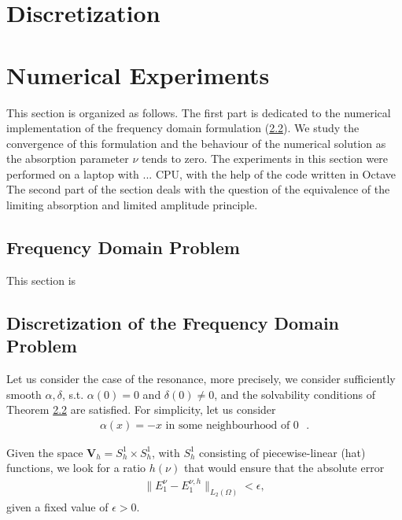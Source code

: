 \documentclass{article}
\begin{document}
\section{Discretization}

\section{Numerical Experiments}
This section is organized as follows. The first part is dedicated to the numerical implementation
of the frequency domain formulation (\ref{}). We study the convergence of this formulation and the behaviour 
of the numerical solution as the absorption parameter $\nu$ tends to zero. The experiments in this section were 
performed on a laptop with ... CPU, with the help of the code written in Octave 
The second part of the section deals with the question of the equivalence of the limiting absorption and limited amplitude 
principle.
\subsection{Frequency Domain Problem}
This section is 



\subsection{Discretization of the Frequency Domain Problem}

Let us consider the case of the resonance, more precisely, we consider sufficiently smooth
$\alpha,\delta$, s.t. $\alpha(0)=0$ and $\delta(0)\neq 0$, and the solvability conditions 
of Theorem \ref{}  are satisfied. 
For simplicity, let us consider 
\begin{align}
\label{eq:cond}
 \alpha(x)=-x \text{  in some neighbourhood of $0$ }.
\end{align}


Given the space $\mathbf{V}_{h}=S_{h}^{1}\times S_{h}^{1}$, with $S_{h}^{1}$ consisting of piecewise-linear (hat) functions, we look for a ratio $h(\nu)$ that would ensure that the absolute error 
\begin{align}
\label{eq:problem1}
\|E^{\nu}_{1}-E^{\nu,h}_{1}\|_{L_{2}(\Omega)}<\epsilon,
\end{align}
given a fixed value of $\epsilon>0$. 
\end{document}
